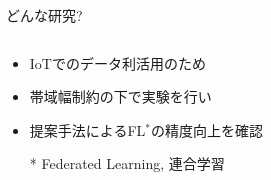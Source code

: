 \documentclass[unicode,12pt,aspectratio=169, dvipdfmx]{beamer}
\begin{document}
    \begin{frame}{どんな研究?}
        \begin{columns}
            \begin{column}{.8\linewidth}
                \begin{itemize}
                    \item IoTでのデータ利活用のため
                    \item 帯域幅制約の下で実験を行い
                    \item 提案手法によるFL$^{*}$の精度向上を確認
                    
                    \small {* Federated Learning, 連合学習}
                \end{itemize}          
            \end{column}
        \end{columns}
    \end{frame}


\end{document}
